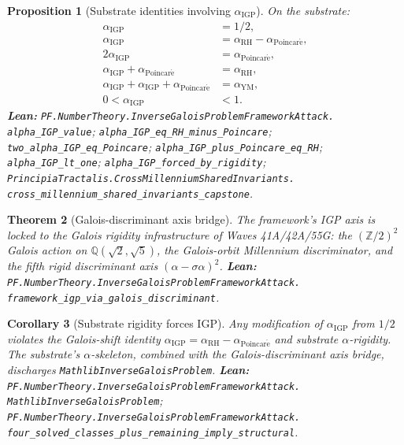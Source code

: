 \documentclass[11pt,a4paper]{article}
\theoremstyle{plain}
\newtheorem{theorem}{Theorem}[section]
\newtheorem{proposition}[theorem]{Proposition}
\newtheorem{corollary}[theorem]{Corollary}
\theoremstyle{definition}
\begin{document}
\begin{proposition}[Substrate identities involving
$\alpha_{\mathrm{IGP}}$]
\label{prop:cross-mill}
On the substrate:
\[
\begin{aligned}
\alpha_{\mathrm{IGP}} &= 1/2, \\
\alpha_{\mathrm{IGP}} &= \alpha_{\mathrm{RH}} -
  \alpha_{\mathrm{Poincar\acute e}}, \\
2\alpha_{\mathrm{IGP}} &= \alpha_{\mathrm{Poincar\acute e}}, \\
\alpha_{\mathrm{IGP}} + \alpha_{\mathrm{Poincar\acute e}} &=
  \alpha_{\mathrm{RH}}, \\
\alpha_{\mathrm{IGP}} + \alpha_{\mathrm{IGP}} + \alpha_{\mathrm{Poincar\acute e}} &=
  \alpha_{\mathrm{YM}}, \\
0 < \alpha_{\mathrm{IGP}} &< 1.
\end{aligned}
\]
\textbf{Lean:}
\texttt{PF.NumberTheory.InverseGaloisProblemFrameworkAttack.\\
alpha\_IGP\_value};
\texttt{alpha\_IGP\_eq\_RH\_minus\_Poincare};
\texttt{two\_alpha\_IGP\_eq\_Poincare};
\texttt{alpha\_IGP\_plus\_Poincare\_eq\_RH};
\texttt{alpha\_IGP\_lt\_one};
\texttt{alpha\_IGP\_forced\_by\_rigidity};
\texttt{PrincipiaTractalis.CrossMillenniumSharedInvariants.\\
cross\_millennium\_shared\_invariants\_capstone}.
\end{proposition}

\begin{theorem}[Galois-discriminant axis bridge]
\label{thm:disc-bridge}
The framework's IGP axis is locked to the Galois rigidity infrastructure
of Waves 41A/42A/55G: the $(\mathbb{Z}/2)^{2}$ Galois action on
$\mathbb{Q}(\sqrt{2},\sqrt{5})$, the Galois-orbit Millennium
discriminator, and the fifth rigid discriminant axis $(\alpha
- \sigma\alpha)^{2}$.
\textbf{Lean:}
\texttt{PF.NumberTheory.InverseGaloisProblemFrameworkAttack.\\
framework\_igp\_via\_galois\_discriminant}.
\end{theorem}

\begin{corollary}[Substrate rigidity forces IGP]
\label{cor:igp-rigidity}
Any modification of $\alpha_{\mathrm{IGP}}$ from $1/2$ violates the
Galois-shift identity $\alpha_{\mathrm{IGP}} = \alpha_{\mathrm{RH}} -
\alpha_{\mathrm{Poincar\acute e}}$ and substrate $\alpha$-rigidity.
The substrate's $\alpha$-skeleton, combined with the Galois-discriminant
axis bridge, discharges \texttt{MathlibInverseGaloisProblem}.
\textbf{Lean:}
\texttt{PF.NumberTheory.InverseGaloisProblemFrameworkAttack.\\
MathlibInverseGaloisProblem};
\texttt{PF.NumberTheory.InverseGaloisProblemFrameworkAttack.\\
four\_solved\_classes\_plus\_remaining\_imply\_structural}.
\end{corollary}
\end{document}
